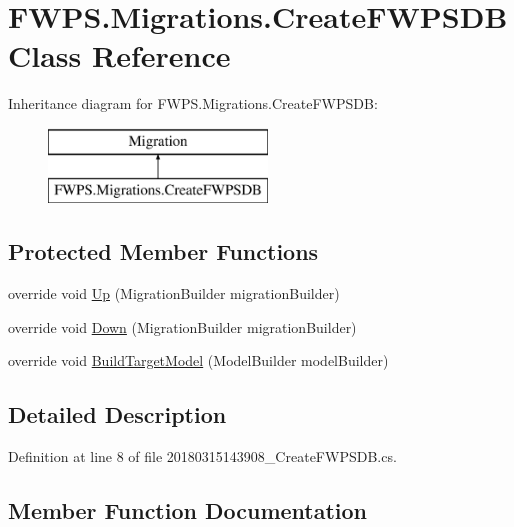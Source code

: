 \hypertarget{class_f_w_p_s_1_1_migrations_1_1_create_f_w_p_s_d_b}{}\section{F\+W\+P\+S.\+Migrations.\+Create\+F\+W\+P\+S\+DB Class Reference}
\label{class_f_w_p_s_1_1_migrations_1_1_create_f_w_p_s_d_b}
Inheritance diagram for F\+W\+P\+S.\+Migrations.\+Create\+F\+W\+P\+S\+DB\+:\begin{figure}[H]
\begin{center}
\leavevmode
\includegraphics[height=2.000000cm]{class_f_w_p_s_1_1_migrations_1_1_create_f_w_p_s_d_b}
\end{center}
\end{figure}
\subsection*{Protected Member Functions}
\begin{DoxyCompactItemize}
\item 
override void \mbox{\hyperlink{class_f_w_p_s_1_1_migrations_1_1_create_f_w_p_s_d_b_ab1f5efdd20dfb530ad4b6095bff64560}{Up}} (Migration\+Builder migration\+Builder)
\item 
override void \mbox{\hyperlink{class_f_w_p_s_1_1_migrations_1_1_create_f_w_p_s_d_b_a9bdde297a0c7ec1c835146549a3d8eed}{Down}} (Migration\+Builder migration\+Builder)
\item 
override void \mbox{\hyperlink{class_f_w_p_s_1_1_migrations_1_1_create_f_w_p_s_d_b_ae33ea01fb37beba5e53d237df82a9d9e}{Build\+Target\+Model}} (Model\+Builder model\+Builder)
\end{DoxyCompactItemize}


\subsection{Detailed Description}


Definition at line 8 of file 20180315143908\+\_\+\+Create\+F\+W\+P\+S\+D\+B.\+cs.



\subsection{Member Function Documentation}
\mbox{\label{class_f_w_p_s_1_1_migrations_1_1_create_f_w_p_s_d_b_ae33ea01fb37beba5e53d237df82a9d9e}} 
